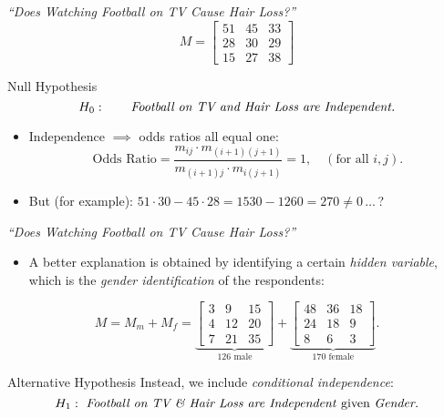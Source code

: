 \begin{frame}{\emph{``Does Watching Football on TV Cause Hair Loss?''}}
    $$ M = \begin{bmatrix} 
    51 & 45 & 33 \\ 
    28 & 30 & 29 \\ 
    15 & 27 & 38
    \end{bmatrix} $$

    \begin{block}{Null Hypothesis}
    \vspace*{-18pt}
        \begin{equation*}
            H_{0}: \qquad \text{\emph{Football on TV and Hair Loss are Independent.}}
        \end{equation*}
    \vspace*{-18pt}
    \end{block}

    \begin{itemize}
        \item Independence $\implies$ odds ratios all equal one:
            $$ \text{Odds Ratio} = \frac{ m_{ij}\cdot m_{(i+1)(j+1)} } { m_{(i+1)j} \cdot m_{i(j+1)} } = 1, \quad (\text{for all } i,j). $$
        \item But (for example): $51 \cdot 30 - 45 \cdot 28 = 1530 - 1260 = 270 \neq 0\, \ldots\, $?
    \end{itemize}

\end{frame}

\begin{frame}{\emph{``Does Watching Football on TV Cause Hair Loss?''}}

    \begin{itemize}
        \item A better explanation is obtained by identifying a certain \emph{hidden variable}, which is the \emph{gender identification} of the respondents:
    \end{itemize}

    $$ M  = M_{m} + M_{f} = 
    \underbrace{\begin{bmatrix} 
    3 & 9 & 15 \\ 
    4 & 12 & 20 \\ 
    7 & 21 & 35
    \end{bmatrix}}_{126 \text{ male}} + 
    \underbrace{\begin{bmatrix} 
    48 & 36 & 18 \\
    24 & 18 & 9 \\
    8 & 6 & 3
    \end{bmatrix}}_{170 \text{ female}}.  $$

    \begin{block}{Alternative Hypothesis}
        Instead, we include \emph{conditional independence}:
        \begin{equation*}
            H_{1}: \text{ \emph{Football on TV \& Hair Loss are Independent} given \emph{Gender.}}
        \end{equation*}
    \end{block}

\end{frame}
